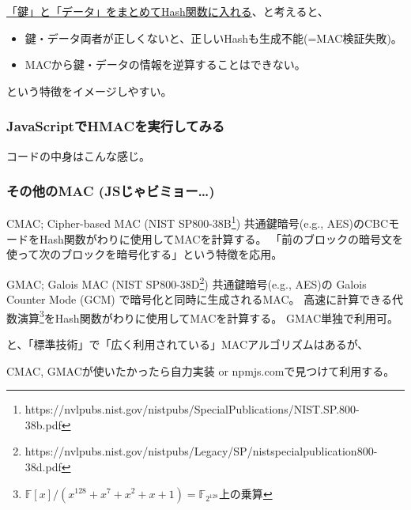 \documentclass[12pt,dvipdfmx]{beamer}
\begin{document}
\begin{frame}
\underline{「鍵」と「データ」をまとめてHash関数に入れる}、と考えると、
\begin{itemize}
 \item 鍵・データ両者が正しくないと、正しいHashも生成不能(=MAC検証失敗)。
 \item MACから鍵・データの情報を逆算することはできない。
\end{itemize}
という特徴をイメージしやすい。
\end{frame}

\begin{frame}
\frametitle{JavaScriptでHMACを実行してみる}
\end{frame}

\begin{frame}
コードの中身はこんな感じ。
\end{frame}

\begin{frame}
\frametitle{その他のMAC (JSじゃビミョー…)}
\begin{block}{\small CMAC; Cipher-based MAC (NIST SP800-38B\footnote[frame]{\scriptsize https://nvlpubs.nist.gov/nistpubs/SpecialPublications/NIST.SP.800-38b.pdf})}
\alert{共通鍵暗号(e.g., AES)のCBCモードをHash関数がわりに使用}してMACを計算する。
「前のブロックの暗号文を使って次のブロックを暗号化する」という特徴を応用。
\end{block}

\begin{block}{\small GMAC; Galois MAC (NIST SP800-38D\footnote[frame]{\scriptsize https://nvlpubs.nist.gov/nistpubs/Legacy/SP/nistspecialpublication800-38d.pdf})}
共通鍵暗号(e.g., AES)の Galois Counter Mode (GCM) で暗号化と同時に生成されるMAC。
\alert{高速に計算できる代数演算\footnote[frame]{\scriptsize $\mathbb{F}[x]/(x^{128}\!+\!x^7\!+\!x^2\!+\!x\!+\!1) = \mathbb{F}_{2^{128}}$上の乗算}をHash関数がわりに使用}してMACを計算する。
GMAC単独で利用可。
\end{block}

\end{frame}

\begin{frame}

と、「標準技術」で「広く利用されている」MACアルゴリズムはあるが、

\vspace{2ex}

CMAC, GMACが使いたかったら自力実装 or npmjs.comで見つけて利用する。
\end{frame}
\end{document}
